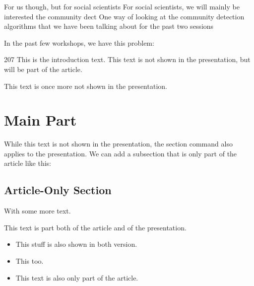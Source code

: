 For us though,  but for social scientists
For social scientists, we will mainly be interested the community dect
One way of looking at the community detection algorithms that we have been talking about for the past two sessions

In the past few workshops, we have  this problem:




207
This is the introduction text. This text is not shown in the
presentation, but will be part of the article.

This text is once more not shown in the presentation.
\section{Main Part}
While this text is not shown in the presentation, the section command
also applies to the presentation.
We can add a subsection that is only part of the article like this:
\subsection<article>{Article-Only Section}
With some more text.
\begin{frame}
This text is part both of the article and of the presentation.
\begin{itemize}
\item This stuff is also shown in both version.
\item This too.
\item<presentation:only@0> This text is also only part of the article.
\end{itemize}
\end{frame}

